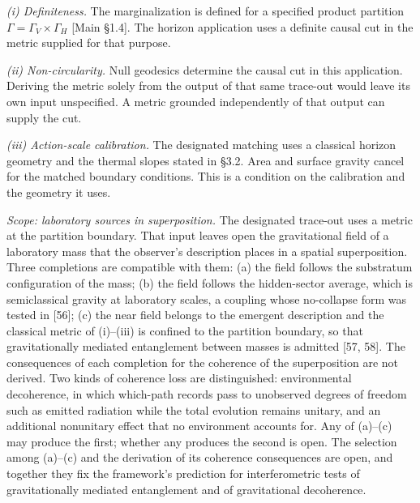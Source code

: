 \documentclass[
]{article}
\begin{document}
\emph{(i) Definiteness.} The marginalization is defined for a specified
product partition \(\Gamma=\Gamma_V\times\Gamma_H\) {[}Main §1.4{]}. The
horizon application uses a definite causal cut in the metric supplied
for that purpose.

\emph{(ii) Non-circularity.} Null geodesics determine the causal cut in
this application. Deriving the metric solely from the output of that
same trace-out would leave its own input unspecified. A metric grounded
independently of that output can supply the cut.

\emph{(iii) Action-scale calibration.} The designated matching uses a
classical horizon geometry and the thermal slopes stated in §3.2. Area
and surface gravity cancel for the matched boundary conditions. This is
a condition on the calibration and the geometry it uses.

\emph{Scope: laboratory sources in superposition.} The designated
trace-out uses a metric at the partition boundary. That input leaves
open the gravitational field of a laboratory mass that the observer's
description places in a spatial superposition. Three completions are
compatible with them: (a) the field follows the substratum configuration
of the mass; (b) the field follows the hidden-sector average, which is
semiclassical gravity at laboratory scales, a coupling whose no-collapse
form was tested in {[}56{]}; (c) the near field belongs to the emergent
description and the classical metric of (i)--(iii) is confined to the
partition boundary, so that gravitationally mediated entanglement
between masses is admitted {[}57, 58{]}. The consequences of each
completion for the coherence of the superposition are not derived. Two
kinds of coherence loss are distinguished: environmental decoherence, in
which which-path records pass to unobserved degrees of freedom such as
emitted radiation while the total evolution remains unitary, and an
additional nonunitary effect that no environment accounts for. Any of
(a)--(c) may produce the first; whether any produces the second is open.
The selection among (a)--(c) and the derivation of its coherence
consequences are open, and together they fix the framework's prediction
for interferometric tests of gravitationally mediated entanglement and
of gravitational decoherence.
\end{document}
